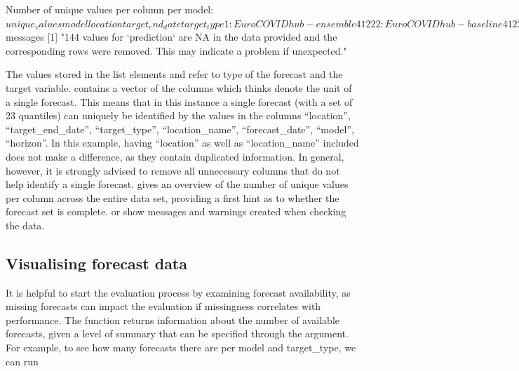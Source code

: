 \documentclass[
]{jss}
\begin{document}
\begin{CodeChunk}
\begin{CodeOutput}
Number of unique values per column per model:
$unique_values
                   model location target_end_date target_type
1: EuroCOVIDhub-ensemble        4              12           2
2: EuroCOVIDhub-baseline        4              12           2
3:  epiforecasts-EpiNow2        4              12           2
4:       UMass-MechBayes        4              12           1
   true_value location_name forecast_date quantile prediction horizon
1:         96             4            11       23       3969       3
2:         96             4            11       23       3733       3
3:         95             4            11       23       3903       3
4:         48             4            11       23       1058       3

$messages
[1] "144 values for `prediction` are NA in the data provided and the corresponding rows were removed. This may indicate a problem if unexpected."
\end{CodeOutput}
\end{CodeChunk}

The values stored in the list elements  and
 refer to type of the forecast and the target
variable.  contains a vector of the columns which
 thinks denote the unit of a single forecast. This
means that in this instance a single forecast (with a set of 23
quantiles) can uniquely be identified by the values in the columns
``location'', ``target\_end\_date'', ``target\_type'',
``location\_name'', ``forecast\_date'', ``model'', ``horizon''. In this
example, having ``location'' as well as ``location\_name'' included does
not make a difference, as they contain duplicated information. In
general, however, it is strongly advised to remove all unnecessary
columns that do not help identify a single forecast.
 gives an overview of the number of unique values
per column across the entire data set, providing a first hint as to
whether the forecast set is complete.  or 
show messages and warnings created when checking the data.

\hypertarget{visualising-forecast-data}{%
\subsection{Visualising forecast data}\label{visualising-forecast-data}}

It is helpful to start the evaluation process by examining forecast
availability, as missing forecasts can impact the evaluation if
missingness correlates with performance. The function
 returns information about the number of
available forecasts, given a level of summary that can be specified
through the  argument. For example, to see how many forecasts
there are per model and target\_type, we can run
\end{document}
